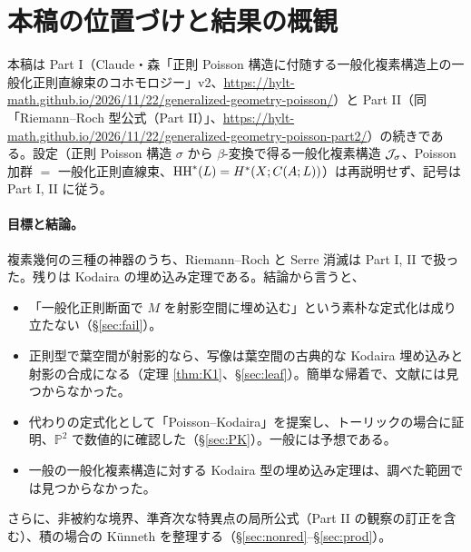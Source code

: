 \section{本稿の位置づけと結果の概観}\label{sec:intro}
本稿は Part I（Claude・森「正則 Poisson 構造に付随する一般化複素構造上の一般化正則直線束のコホモロジー」v2、\url{https://hylt-math.github.io/2026/11/22/generalized-geometry-poisson/}）と Part II（同「Riemann--Roch 型公式（Part II）」、\url{https://hylt-math.github.io/2026/11/22/generalized-geometry-poisson-part2/}）の続きである。設定（正則 Poisson 構造 $\sigma$ から $\beta$-変換で得る一般化複素構造 $\mathcal J_\sigma$、Poisson 加群 $=$ 一般化正則直線束、$\mathrm{HH}^*(L)=H^*(X;C(A;L))$）は再説明せず、記号は Part I, II に従う。

\paragraph{目標と結論。}
複素幾何の三種の神器のうち、Riemann--Roch と Serre 消滅は Part I, II で扱った。残りは Kodaira の埋め込み定理である。結論から言うと、
\begin{itemize}
\item 「一般化正則断面で $M$ を射影空間に埋め込む」という素朴な定式化は成り立たない（\S\ref{sec:fail}）\tP。
\item 正則型で葉空間が射影的なら、写像は葉空間の古典的な Kodaira 埋め込みと射影の合成になる（定理 \ref{thm:K1}、\S\ref{sec:leaf}）\tP。簡単な帰着で、文献には見つからなかった。
\item 代わりの定式化として「Poisson--Kodaira」を提案し、トーリックの場合に証明、$\mathbb P^2$ で数値的に確認した（\S\ref{sec:PK}）。一般には予想である\tK。
\item 一般の一般化複素構造に対する Kodaira 型の埋め込み定理は、調べた範囲では見つからなかった\tC。
\end{itemize}
さらに、非被約な境界、準斉次な特異点の局所公式（Part II の観察の訂正を含む）、積の場合の Künneth を整理する（\S\ref{sec:nonred}--\S\ref{sec:prod}）。


